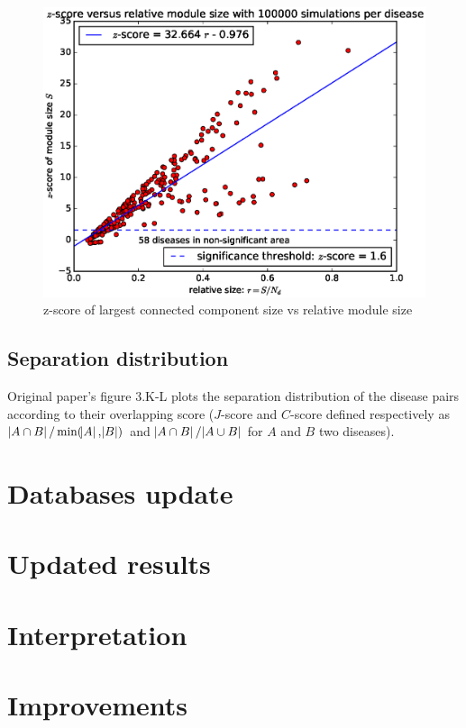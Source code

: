 \documentclass[letterpaper]{article}
\begin{document}
	\begin{figure}
		\includegraphics[scale=.45]{images/S4.b100000.eps}
		\caption{z-score of largest connected component size vs relative module size\label{fig:zscore}}
	\end{figure}

	\subsection{Separation distribution}
	Original paper's figure 3.K-L plots the separation distribution of the disease pairs according to their
	overlapping score ($J$-score and $C$-score defined respectively as $\abs {A \cap B}/\min(\abs A, \abs B)$ and
	$\abs {A \cap B}/\abs {A \cup B}$ for $A$ and $B$ two diseases).

\section{Databases update}

\section{Updated results}

\section{Interpretation}

\section{Improvements}
\end{document}
